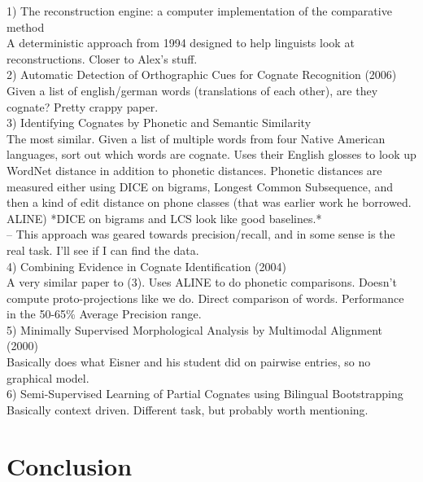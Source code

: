 \documentclass[11pt,a4paper]{article}
\begin{document}
1) The reconstruction engine: a computer implementation of the
comparative method\\
  A deterministic approach from 1994 designed to help linguists look
at reconstructions. Closer to Alex's stuff. \\
2) Automatic Detection of Orthographic Cues for Cognate Recognition (2006) \\
  Given a list of english/german words (translations of each other),
are they cognate? Pretty crappy paper.\\
3) Identifying Cognates by Phonetic and Semantic Similarity \\
  The most similar. Given a list of multiple words from four Native
American languages, sort out which words are cognate. Uses their
English glosses to look up WordNet distance in addition to phonetic
distances. Phonetic distances are measured either using DICE on
bigrams, Longest Common Subsequence, and then a kind of edit distance
on phone classes (that was earlier work he borrowed. ALINE) *DICE on
bigrams and LCS look like good baselines.*\\
  -- This approach was geared towards precision/recall, and in some
sense is the real task. I'll see if I can find the data. \\
4)  Combining Evidence in Cognate Identification (2004) \\
  A very similar paper to (3). Uses ALINE to do phonetic comparisons.
Doesn't compute proto-projections like we do. Direct comparison of
words. Performance in the 50-65\% Average Precision range.\\
5) Minimally Supervised Morphological Analysis by Multimodal Alignment (2000) \\
  Basically does what Eisner and his student did on pairwise entries,
so no graphical model.\\
6) Semi-Supervised Learning of Partial Cognates using Bilingual Bootstrapping
  Basically context driven. Different task, but probably worth mentioning.

\section{Conclusion}


\end{document}
